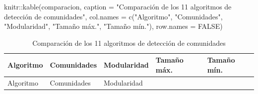 \documentclass[
  letterpaper,
  DIV=11,
  numbers=noendperiod]{scrreprt}
\newenvironment{Shaded}{\begin{snugshade}}{\end{snugshade}}
\newcommand{\AttributeTok}[1]{\textcolor[rgb]{0.40,0.45,0.13}{#1}}
\newcommand{\ConstantTok}[1]{\textcolor[rgb]{0.56,0.35,0.01}{#1}}
\newcommand{\FunctionTok}[1]{\textcolor[rgb]{0.28,0.35,0.67}{#1}}
\newcommand{\NormalTok}[1]{\textcolor[rgb]{0.00,0.23,0.31}{#1}}
\newcommand{\SpecialCharTok}[1]{\textcolor[rgb]{0.37,0.37,0.37}{#1}}
\newcommand{\StringTok}[1]{\textcolor[rgb]{0.13,0.47,0.30}{#1}}
\begin{document}
\begin{Shaded}
\begin{Highlighting}[]
\NormalTok{knitr}\SpecialCharTok{::}\FunctionTok{kable}\NormalTok{(comparacion,}
             \AttributeTok{caption =} \StringTok{"Comparación de los 11 algoritmos de detección de comunidades"}\NormalTok{,}
             \AttributeTok{col.names =} \FunctionTok{c}\NormalTok{(}\StringTok{"Algoritmo"}\NormalTok{, }\StringTok{"Comunidades"}\NormalTok{, }\StringTok{"Modularidad"}\NormalTok{, }
                           \StringTok{"Tamaño máx."}\NormalTok{, }\StringTok{"Tamaño mín."}\NormalTok{),}
             \AttributeTok{row.names =} \ConstantTok{FALSE}\NormalTok{)}
\end{Highlighting}
\end{Shaded}

\begin{longtable}[]{@{}
  >{\raggedright\arraybackslash}p{}
  >{\raggedleft\arraybackslash}p{}
  >{\raggedleft\arraybackslash}p{}
  >{\raggedleft\arraybackslash}p{}
  >{\raggedleft\arraybackslash}p{}@{}}
\caption{Comparación de los 11 algoritmos de detección de
comunidades}\tabularnewline
\toprule\noalign{}
\begin{minipage}[b]{\linewidth}\raggedright
Algoritmo
\end{minipage} & \begin{minipage}[b]{\linewidth}\raggedleft
Comunidades
\end{minipage} & \begin{minipage}[b]{\linewidth}\raggedleft
Modularidad
\end{minipage} & \begin{minipage}[b]{\linewidth}\raggedleft
Tamaño máx.
\end{minipage} & \begin{minipage}[b]{\linewidth}\raggedleft
Tamaño mín.
\end{minipage} \\
\midrule\noalign{}
\endfirsthead
\toprule\noalign{}
\begin{minipage}[b]{\linewidth}\raggedright
Algoritmo
\end{minipage} & \begin{minipage}[b]{\linewidth}\raggedleft
Comunidades
\end{minipage} & \begin{minipage}[b]{\linewidth}\raggedleft
Modularidad
\end{minipage} & \begin{minipage}[b]{\linewidth}\raggedleft

\end{minipage}
\end{longtable}
\end{document}
